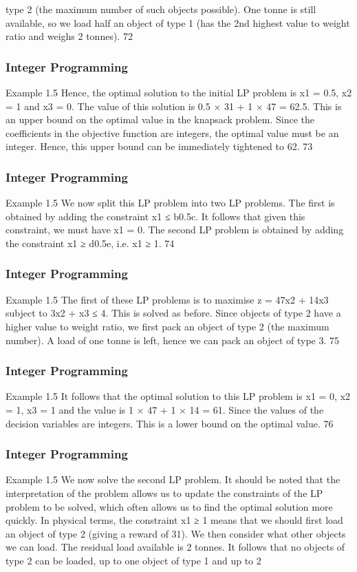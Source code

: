 \begin{frame}
type 2 (the maximum number of such objects possible).
One tonne is still available, so we load half an object of type 1 (has
the 2nd highest value to weight ratio and weighs 2 tonnes).
72 \end{frame}  \begin{frame} \frametitle{Integer Programming}     
Example 1.5
Hence, the optimal solution to the initial LP problem is x1 = 0.5,
x2 = 1 and x3 = 0.
The value of this solution is 0.5 × 31 + 1 × 47 = 62.5.
This is an upper bound on the optimal value in the knapsack
problem.
Since the coefficients in the objective function are integers, the
optimal value must be an integer. Hence, this upper bound can be
immediately tightened to 62.
73 \end{frame}  \begin{frame} \frametitle{Integer Programming}     
Example 1.5
We now split this LP problem into two LP problems.
The first is obtained by adding the constraint x1 ≤ b0.5c. It follows
that given this constraint, we must have x1 = 0.
The second LP problem is obtained by adding the constraint
x1 ≥ d0.5e, i.e. x1 ≥ 1.
74 \end{frame}  \begin{frame} \frametitle{Integer Programming}     
Example 1.5
The first of these LP problems is to maximise
z = 47x2 + 14x3
subject to
3x2 + x3 ≤ 4.
This is solved as before. Since objects of type 2 have a higher
value to weight ratio, we first pack an object of type 2 (the
maximum number).
A load of one tonne is left, hence we can pack an object of type 3.
75 \end{frame}  \begin{frame} \frametitle{Integer Programming}     
Example 1.5
It follows that the optimal solution to this LP problem is
x1 = 0, x2 = 1, x3 = 1 and the value is 1 × 47 + 1 × 14 = 61.
Since the values of the decision variables are integers. This is a
lower bound on the optimal value.
76 \end{frame}  \begin{frame} \frametitle{Integer Programming}     
Example 1.5
We now solve the second LP problem. It should be noted that the
interpretation of the problem allows us to update the constraints of
the LP problem to be solved, which often allows us to find the
optimal solution more quickly.
In physical terms, the constraint x1 ≥ 1 means that we should first
load an object of type 2 (giving a reward of 31).
We then consider what other objects we can load.
The residual load available is 2 tonnes. It follows that no objects of
type 2 can be loaded, up to one object of type 1 and up to 2

\end{frame}
